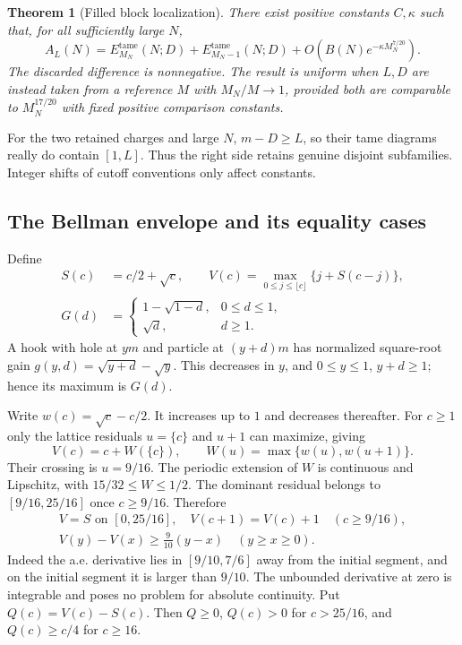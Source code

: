 \documentclass[11pt]{article}
\newtheorem{theorem}{Theorem}[section]
\theoremstyle{remark}\newtheorem{remark}[theorem]{Remark}
\begin{document}
\begin{theorem}[Filled block localization]\label{stp:sum:thm:global}
There exist positive constants $C,\kappa$ such that, for all sufficiently large $N$,
\begin{equation}\label{stp:sum:eq:global}
 A_L(N)=E_{M_N}^{\mathrm{tame}}(N;D)
       +E_{M_N-1}^{\mathrm{tame}}(N;D)
       +O(B(N)e^{-\kappa M_N^{7/20}}).
\end{equation}
The discarded difference is nonnegative. The result is uniform when $L,D$ are instead taken from a reference $M$ with $M_N/M\to1$, provided both are comparable to $M_N^{17/20}$ with fixed positive comparison constants.
\end{theorem}
For the two retained charges and large $N$, $m-D\ge L$, so their tame diagrams really do contain $[1,L]$. Thus the right side retains genuine disjoint subfamilies. Integer shifts of cutoff conventions only affect constants.

\subsection{The Bellman envelope and its equality cases}
Define
\begin{align}
 S(c)&=c/2+\sqrt c,\qquad
 V(c)=\max_{0\le j\le\lfloor c\rfloor}\{j+S(c-j)\},\label{stp:sum:eq:V}\\
 G(d)&=\begin{cases}1-\sqrt{1-d},&0\le d\le1,\\\sqrt d,&d\ge1.\end{cases}\label{stp:sum:eq:G}
\end{align}
A hook with hole at $ym$ and particle at $(y+d)m$ has normalized square-root gain $g(y,d)=\sqrt{y+d}-\sqrt y$. This decreases in $y$, and $0\le y\le1$, $y+d\ge1$; hence its maximum is $G(d)$.

Write $w(c)=\sqrt c-c/2$. It increases up to $1$ and decreases thereafter. For $c\ge1$ only the lattice residuals $u=\{c\}$ and $u+1$ can maximize, giving
\begin{equation}\label{stp:sum:eq:periodicW}
 V(c)=c+W(\{c\}),\qquad
 W(u)=\max\{w(u),w(u+1)\}.
\end{equation}
Their crossing is $u=9/16$. The periodic extension of $W$ is continuous and Lipschitz, with $15/32\le W\le1/2$. The dominant residual belongs to $[9/16,25/16]$ once $c\ge9/16$. Therefore
\begin{gather}
 V=S\text{ on }[0,25/16],\quad V(c+1)=V(c)+1\quad(c\ge9/16),\label{stp:sum:eq:Vfacts}\\
 V(y)-V(x)\ge\tfrac9{10}(y-x)\quad(y\ge x\ge0).\label{stp:sum:eq:Vderiv}
\end{gather}
Indeed the a.e. derivative lies in $[9/10,7/6]$ away from the initial segment, and on the initial segment it is larger than $9/10$. The unbounded derivative at zero is integrable and poses no problem for absolute continuity. Put $Q(c)=V(c)-S(c)$. Then $Q\ge0$, $Q(c)>0$ for $c>25/16$, and $Q(c)\ge c/4$ for $c\ge16$.
\end{document}
